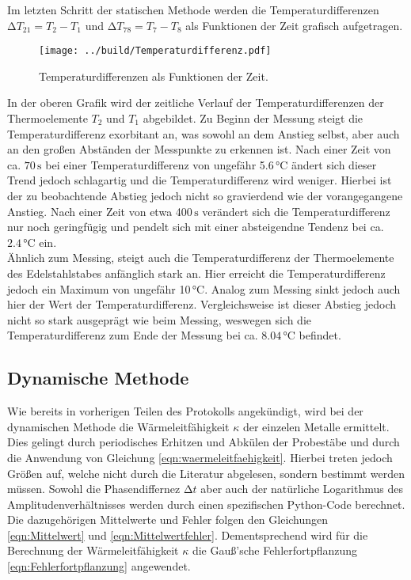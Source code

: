 Im letzten Schritt der statischen Methode werden die Temperaturdifferenzen $\increment T_{21} = T_2 - T_1$ und
$\increment T_{78} = T_7 - T_8$
als Funktionen der Zeit grafisch aufgetragen.

\begin{figure}
  \centering
  \texttt{[image: ../build/Temperaturdifferenz.pdf]}
  \caption{Temperaturdifferenzen als Funktionen der Zeit.}
  \label{fig:statisch3}
\end{figure}

In der oberen Grafik wird der zeitliche Verlauf der Temperaturdifferenzen der Thermoelemente $T_2$ und $T_1$ abgebildet.
Zu Beginn der Messung steigt die Temperaturdifferenz exorbitant an, was sowohl an dem Anstieg selbst, aber auch an den 
großen Abständen der Messpunkte zu erkennen ist. Nach einer Zeit von ca. $70\,\unit{\second}$ bei einer Temperaturdifferenz von ungefähr 5.6\,\unit{\celsius} ändert sich dieser Trend jedoch
schlagartig und die Temperaturdifferenz wird weniger. Hierbei ist der zu beobachtende Abstieg jedoch nicht so gravierdend wie
der vorangegangene Anstieg. Nach einer Zeit von etwa 400\,$\unit{\second}$ verändert sich die Temperaturdifferenz nur noch 
geringfügig und pendelt sich mit einer absteigendne Tendenz bei ca.$2.4\,\unit{\celsius}$ ein.\\
Ähnlich zum Messing, steigt auch die Temperaturdifferenz der Thermoelemente des Edelstahlstabes anfänglich stark an. Hier erreicht die 
Temperaturdifferenz jedoch ein Maximum von ungefähr 10\,$\unit{\celsius}$. Analog zum Messing sinkt jedoch auch hier der Wert der 
Temperaturdifferenz. Vergleichsweise ist dieser Abstieg jedoch nicht so stark ausgeprägt wie beim Messing, weswegen sich die Temperaturdifferenz
zum Ende der Messung bei ca. $8.04\,\unit{\celsius}$ befindet.

\subsection{Dynamische Methode}

Wie bereits in vorherigen Teilen des Protokolls angekündigt, wird bei der dynamischen Methode die Wärmeleitfähigkeit $\kappa$ der einzelen Metalle
ermittelt. Dies gelingt durch periodisches Erhitzen und Abkülen der Probestäbe und durch die Anwendung von Gleichung \eqref{eqn:waermeleitfaehigkeit}.
Hierbei treten jedoch Größen auf, welche nicht durch die Literatur abgelesen, sondern bestimmt werden müssen. Sowohl die Phasendiffernez $\increment t$
aber auch der natürliche Logarithmus des Amplitudenverhältnisses werden durch einen spezifischen Python-Code berechnet. Die dazugehörigen Mittelwerte und
Fehler folgen den Gleichungen \eqref{eqn:Mittelwert} und \eqref{eqn:Mittelwertfehler}. Dementsprechend wird für die Berechnung der Wärmeleitfähigkeit $\kappa$
die Gauß'sche Fehlerfortpflanzung \eqref{eqn:Fehlerfortpflanzung} angewendet.\\

